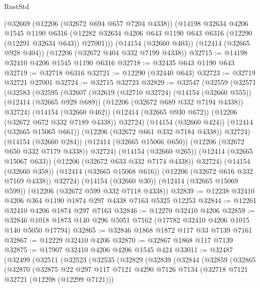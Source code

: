 \begin{lexlean}{RustStd}
\begin{coremodule}
    (@32669
      (@12206 (@32672 @694 @657 @7204 @4338))
      (@14198
        @32634
        @4206
        @1545
        @1190
        @6316
        (@12282 @32634 @4206 @643 @1190 @643 @6316 (@12290 (@12291 @32634 @643)) @27001)))
    (@14154 (@32660 @403))
    (@12414 (@32665 @928 @404))
    (@12206 (@32672 @404 @332 @7199 @4338))
@32715 := @14198 @32410 @4206 @1545 @1190 @6316
@32718 := @32435 @643 @1190 @643
@32719 := @32718 @6316
@32721 := @12290 (@32440 @643)
@32723 := @32719 @32721 @27001
@32724 := @32715 @32723
@32829 := @32547
    (@32559
      (@32571
        (@32583
          (@32595
            (@32607
              (@32619
                (@32710 @32724)
                (@14154 (@32660 @555))
                (@12414 (@32665 @929 @689))
                (@12206 (@32672 @689 @332 @7194 @4338))
                @32724)
              (@14154 (@32660 @462))
              (@12414 (@32665 @930 @672))
              (@12206 (@32672 @672 @332 @7189 @4338))
              @32724)
            (@14154 (@32660 @424))
            (@12414 (@32665 @15065 @661))
            (@12206 (@32672 @661 @332 @7184 @4338))
            @32724)
          (@14154 (@32660 @284))
          (@12414 (@32665 @15066 @650))
          (@12206 (@32672 @650 @332 @7179 @4338))
          @32724)
        (@14154 (@32660 @265))
        (@12414 (@32665 @15067 @633))
        (@12206 (@32672 @633 @332 @7174 @4338))
        @32724)
      (@14154 (@32660 @358))
      (@12414 (@32665 @15068 @616))
      (@12206 (@32672 @616 @332 @7169 @4338))
      @32724)
    (@14154 (@32660 @30))
    (@12414 (@32665 @15069 @599))
    (@12206 (@32672 @599 @332 @7118 @4338))
@32839 := @12238 @32410 @4206 @364 @1190 @1874 @297 @4338 @7163 @5325 @12253
@32844 := @12261 @32410 @4206 @1874 @297 @7163
@32846 := @12270 @32410 @4206
@32859 := @32846 @1018 @1873 @140 @296 @5051 @7162 (@17782 @32410 @4206 @1015 @140 @5050 @17794)
@32865 := @32846 @1868 @1872 @117 @33 @7139 @7161
@32867 := @12229 @32410 @4206
@32870 := @32867 @1868 @117 @7139
@32875 := @17907 @32410 @4206 @4206 @1545 @424
@33011 := @32487
    (@32499
      (@32511
        (@32523
          (@32535
            (@32829
              (@32839
                (@32844
                  (@32859
                    (@32865
                      (@32870
                        (@32875
                          @22
                          @297
                          @117
                          @7121
                          @4290
                          @7126
                          @7134
                          (@32718 @7121 @32721 (@12298 (@12299 @7121)))

\end{coremodule}
\end{lexlean}
